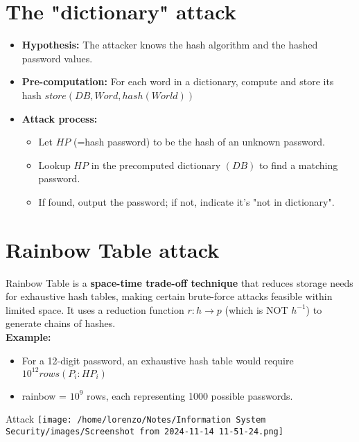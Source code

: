 \section{The "dictionary" attack}
\begin{itemize}
    \item \textbf{Hypothesis:} The attacker knows the hash algorithm and the hashed password values.
    \item \textbf{Pre-computation:} For each word in a dictionary, compute and store its hash \(store(DB,Word,hash(World))\)
    \item \textbf{Attack process:}
    \begin{itemize}
        \item Let \(HP\) (=hash password) to be the hash of an unknown password.
        \item Lookup \(HP\) in the precomputed dictionary \((DB)\) to find a matching password.
        \item If found, output the password; if not, indicate it's "not in dictionary".
    \end{itemize}
\end{itemize}

\section{Rainbow Table attack}
Rainbow Table is a \textbf{space-time trade-off technique} that reduces storage needs for exhaustive hash tables, making certain brute-force attacks feasible within limited space.
It uses a reduction function \(r:h \rightarrow p\) (which is NOT \(h^{-1}\)) to generate chains of hashes.
\\ \textbf{Example:}
\begin{itemize}
    \item For a 12-digit password, an exhaustive hash table would require \(10^{12}rows(P_i:HP_i)\) 
    \item rainbow = \(10^9\) rows, each representing 1000 possible passwords.
\end{itemize}

\begin{center}
\begin{minipage}{0.5\textwidth}
    \begin{quotebox-red}{Attack}
        \centering
        \texttt{[image: /home/lorenzo/Notes/Information System Security/images/Screenshot from 2024-11-14 11-51-24.png]}
\end{quotebox-red}
\end{minipage}
\end{center}

